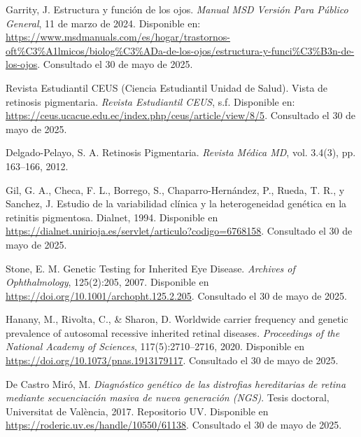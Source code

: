 \documentclass[11pt,spanish,listoffigures,listoftables]{tfgetsinf}
\begin{document}
\begin{thebibliography}{99}
   Garrity, J.  
   \newblock Estructura y función de los ojos.  
   \newblock \textit{Manual MSD Versión Para Público General}, 11 de marzo de 2024.  
   \newblock Disponible en: 
   \url{https://www.msdmanuals.com/es/hogar/trastornos-oft%C3%A1lmicos/biolog%C3%ADa-de-los-ojos/estructura-y-funci%C3%B3n-de-los-ojos}.  
   \newblock Consultado el 30 de mayo de 2025.

   Revista Estudiantil CEUS (Ciencia Estudiantil Unidad de Salud).  
   \newblock Vista de retinosis pigmentaria.  
   \newblock \textit{Revista Estudiantil CEUS}, s.f.  
   \newblock Disponible en: 
   \url{https://ceus.ucacue.edu.ec/index.php/ceus/article/view/8/5}.  
   \newblock Consultado el 30 de mayo de 2025.

   Delgado-Pelayo, S. A.  
   \newblock Retinosis Pigmentaria.  
   \newblock \textit{Revista Médica MD}, vol. 3.4(3), pp. 163--166, 2012.


   Gil, G. A., Checa, F. L., Borrego, S., Chaparro-Hernández, P., Rueda, T. R., y Sanchez, J.  
   \newblock Estudio de la variabilidad clínica y la heterogeneidad genética en la retinitis pigmentosa.  
   \newblock Dialnet, 1994.    
   \newblock Disponible en  
   \url{https://dialnet.unirioja.es/servlet/articulo?codigo=6768158}.
   \newblock Consultado el 30 de mayo de 2025.

   Stone, E. M.  
   \newblock Genetic Testing for Inherited Eye Disease.  
   \newblock \textit{Archives of Ophthalmology}, 125(2):205, 2007.  
   \newblock Disponible en
   \newblock \url{https://doi.org/10.1001/archopht.125.2.205}.
   \newblock Consultado el 30 de mayo de 2025.

   Hanany, M., Rivolta, C., \& Sharon, D.  
   \newblock Worldwide carrier frequency and genetic prevalence of autosomal recessive inherited retinal diseases.  
   \newblock \textit{Proceedings of the National Academy of Sciences}, 117(5):2710–2716, 2020.  
   \newblock Disponible en
   \newblock \url{https://doi.org/10.1073/pnas.1913179117}.
   \newblock Consultado el 30 de mayo de 2025.

   De Castro Miró, M.  
   \newblock \textit{Diagnóstico genético de las distrofias hereditarias de retina mediante secuenciación masiva de nueva generación (NGS)}.  
   \newblock Tesis doctoral, Universitat de València, 2017.  
   \newblock Repositorio UV.  
   \newblock Disponible en
   \newblock \url{https://roderic.uv.es/handle/10550/61138}.
   \newblock Consultado el 30 de mayo de 2025.


\end{thebibliography}
\end{document}
